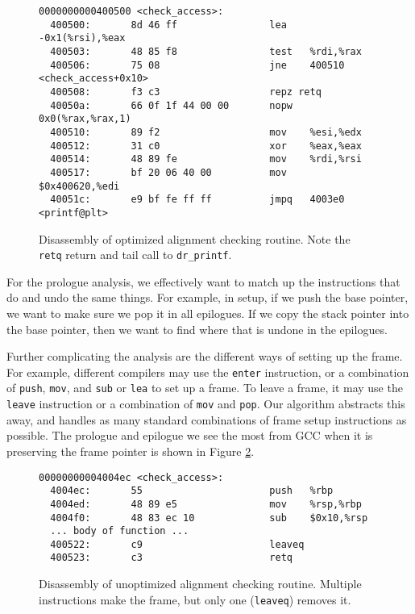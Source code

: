 \begin{figure}
\begin{verbatim}
0000000000400500 <check_access>:
  400500:       8d 46 ff                lea    -0x1(%rsi),%eax
  400503:       48 85 f8                test   %rdi,%rax
  400506:       75 08                   jne    400510 <check_access+0x10>
  400508:       f3 c3                   repz retq 
  40050a:       66 0f 1f 44 00 00       nopw   0x0(%rax,%rax,1)
  400510:       89 f2                   mov    %esi,%edx
  400512:       31 c0                   xor    %eax,%eax
  400514:       48 89 fe                mov    %rdi,%rsi
  400517:       bf 20 06 40 00          mov    $0x400620,%edi
  40051c:       e9 bf fe ff ff          jmpq   4003e0 <printf@plt>
\end{verbatim}
\caption{Disassembly of optimized alignment checking routine.  Note the {\tt
retq} return and tail call to {\tt dr\_printf}.}
\label{fig:align_asm}
\end{figure}

For the prologue analysis, we effectively want to match up the instructions that
do and undo the same things.  For example, in setup, if we push the base
pointer, we want to make sure we pop it in all epilogues.  If we copy the stack
pointer into the base pointer, then we want to find where that is undone in the
epilogues.

Further complicating the analysis are the different ways of setting up the
frame.  For example, different compilers may use the {\tt enter} instruction, or
a combination of {\tt push}, {\tt mov}, and {\tt sub} or {\tt lea} to set up a
frame.  To leave a frame, it may use the {\tt leave} instruction or a
combination of {\tt mov} and {\tt pop}.  Our algorithm abstracts this away, and
handles as many standard combinations of frame setup instructions as possible.
The prologue and epilogue we see the most from GCC when it is preserving the
frame pointer is shown in Figure \ref{fig:frame_asm}.

\begin{figure}
\begin{verbatim}
00000000004004ec <check_access>:
  4004ec:       55                      push   %rbp
  4004ed:       48 89 e5                mov    %rsp,%rbp
  4004f0:       48 83 ec 10             sub    $0x10,%rsp
  ... body of function ...
  400522:       c9                      leaveq 
  400523:       c3                      retq   
\end{verbatim}
\caption{Disassembly of unoptimized alignment checking routine.  Multiple
instructions make the frame, but only one ({\tt leaveq}) removes it.}
\label{fig:frame_asm}
\end{figure}

